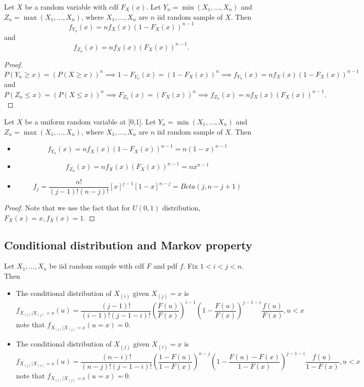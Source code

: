 \begin{refsection}
\begin{lemma}
Let $X$ be a random variable with cdf $F_X(x)$. Let $Y_n = \min(X_1,...,X_n)$ and $Z_n = \max(X_1,...,X_n)$, where $X_1,...,X_n$ are $n$ iid random sample of $X$. Then
$$ f_{Y_n}(x) = nf_X(x)(1 - F_X(x))^{n-1}$$
and
$$ f_{Z_n}(x) = nf_X(x)(F_X(x))^{n-1}.$$
\end{lemma}
\begin{proof}
	$$P(Y_n\geq x) = (P(X\geq x))^n \implies 1 - F_{Y_n}(x) = (1 - F_X(x))^n \implies f_{Y_n}(x) = nf_X(x)(1 - F_X(x))^{n-1}$$
	and
	$$P(Z_n\leq x) = (P(X\leq x))^n \implies  F_{Z_n}(x) = (F_X(x))^n \implies f_{Z_n}(x) = nf_X(x)(F_X(x))^{n-1}.$$
\end{proof}

\begin{corollary}
Let $X$ be a uniform random variable at [0,1]. Let $Y_n = \min(X_1,...,X_n)$ and $Z_n = \max(X_1,...,X_n)$, where $X_1,...,X_n$ are $n$ iid random sample of $X$. Then
\begin{itemize}
	\item $$ f_{Y_n}(x) = nf_X(x)(1 - F_X(x))^{n-1} = n(1-x)^{n-1}$$
	\item $$ f_{Z_n}(x) = nf_X(x)(F_X(x))^{n-1} = nx^{n-1}$$
	\item $$f_j = \frac{n!}{(j-1)!(n-j)!} [x]^{j-1}[1-x]^{n-j} = Beta(j,n-j+1)$$
\end{itemize}
\end{corollary}
\begin{proof}
Note that we use the fact that for $U(0,1)$ distribution, $F_X(x) = x, f_X(x) = 1$.
\end{proof}

\subsection{Conditional distribution and Markov property}
\begin{theorem}
Let $X_1,...,X_n$ be iid random sample with cdf $F$ and pdf $f$. Fix $1<i<j<n$. Then
\begin{itemize}
	\item The conditional distribution of $X_{(i)}$ given $X_{(j)} = x$ is
	$$f_{X_{(i)}|X_{(j)} = x}(u) = \frac{(j-1)!}{(i-1)!(j-1-i)!}(\frac{F(u)}{F(x)})^{i-1}(1-\frac{F(u)}{F(x)})^{j-1-i} \frac{f(u)}{F(x)}, u<x$$
	note that $f_{X_{(i)}|X_{(j)} = x}(u = x) = 0$.
	\item The conditional distribution of $X_{(j)}$ given $X_{(i)} = x$ is
	$$f_{X_{(j)}|X_{(i)} = x}(u) = \frac{(n-i)!}{(n-j)!(j-1-i)!}(\frac{1-F(u)}{1-F(x)})^{n-j}(1-\frac{F(u) - F(x)}{1 - F(x)})^{j-1-i} \frac{f(u)}{1-F(x)}, u<x$$
	note that $f_{X_{(i)}|X_{(j)} = x}(u = x) = 0$.
\end{itemize}	
\end{theorem}




\end{refsection}
